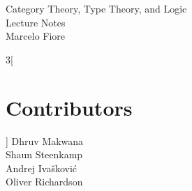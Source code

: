     \setlength\parindent{0pt}
    \setlength\parskip{0.7em}
    
    \newcommand {\cat}{%
        \mathbf%
    }
    \newcommand {\domain}[1] {%
        \mathrm{dom}(#1)%
    }
    \newcommand {\codomain}[1] {%
        \mathrm{cod}(#1)%
    }
    \newcommand {\idarrow}[1][] {%
        \mathbf{1}{#1}%
    }
    \newcommand {\Cat}{%
        \cat {Cat}%
    }
    \newcommand {\Mon}{%
        \cat {Mon}%
    }
    \newcommand {\Poset}{%
        \cat {Poset}%
    }
    \newcommand {\Rel}{%
        \cat {Rel}%
    }
    \newcommand {\Sets}{%
        \cat {Sets}%
    }
    \newcommand {\Groups}{%
        \cat {Groups}%
    }
    \newcommand {\Graphs}{%
        \cat {Graphs}%
    }
    
    \newcommand{\ie}{\emph{i.e.}}
    \newcommand{\etc}{\emph{etc.}}
    
    \newcommand{\eqdef}{\stackrel{\text{def}}{=}} %
    \newcommand{\comp}{\circ} %
    \newcommand{\icomp}{\,} %
    
    \newcommand{\setof}[1]{ \{ #1 \} }
    \newcommand{\bigsetof}[1]{ \big\{ #1 \big\} }
    \newcommand{\suchthat}{\mid}
    \newcommand{\union}{\cup}
    
    \newcommand{\nelem}[1]{ \mathbf{ #1 } }
    \newcommand{\id}[1]{ \mathrm{id}_{ #1 } }
    \newcommand{\nats}{\mathbb{N}}
    
    
    
    \begin{center} {\LARGE \sc
    Category Theory, Type Theory, and Logic\\
      Lecture Notes\\[4mm]}
      \Large Marcelo Fiore
    \end{center}
    
    
    \begin{multicols}{3}[\section*{Contributors}]
    Dhruv Makwana\\ 
    Shaun Steenkamp\\
    Andrej Ivašković\\
    Oliver Richardson
    \end{multicols}
    \clearpage
    
    
    \tableofcontents
    
